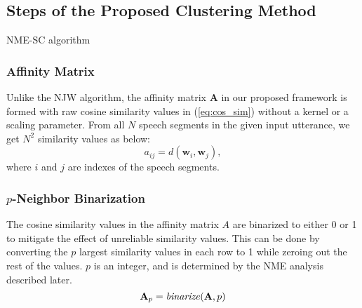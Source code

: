 \documentclass[journal]{IEEEtran}
\begin{document}
\subsection{Steps of the Proposed Clustering Method}
\setlength{\textfloatsep}{5pt}
\begin{algorithm}[t]
\small
\caption{NME-SC algorithm}
\label{alg:loop}
\begin{algorithmic}[1ht]
\vspace{0.5ex}
    \EndFor
    \State {}
\EndProcedure
\end{algorithmic}
\end{algorithm}

\subsubsection{Affinity Matrix} Unlike the NJW algorithm, the affinity matrix \textbf{A} in our proposed framework is formed with raw cosine similarity values in (\ref{eq:cos_sim}) without a kernel or a scaling parameter. From all $N$ speech segments in the given input utterance, we get $N^2$ similarity values as below:
  \begin{equation}
      a_{ij} = d(\mathbf{w}_i, \mathbf{w}_j),
  \end{equation}
  where $i$ and $j$ are indexes of the speech segments.
  \subsubsection{$p$-Neighbor Binarization} The cosine similarity values in the affinity matrix $A$ are binarized to either 0 or 1 to mitigate the effect of unreliable similarity values. This can be done by converting the $p$ largest similarity values in each row to 1 while zeroing out the rest of the values. $p$ is an integer, and is determined by the NME analysis described later.
\begin{equation}
\label{eq:A_p}
    \mathbf{A}_p = \text{\textit{binarize}}(\mathbf{A}, p)
\end{equation}
\end{document}
